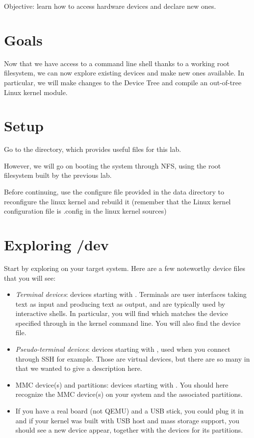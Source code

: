 {Objective: learn how to access hardware devices and declare new ones.}

\section{Goals}

Now that we have access to a command line shell thanks to a working root
filesystem, we can now explore existing devices and make new ones
available. In particular, we will make changes to the Device Tree
and compile an out-of-tree Linux kernel module.

\section{Setup}

Go to the  directory,
which provides useful files for this lab.

However, we will go on booting the system through NFS, using the
root filesystem built by the previous lab.

Before continuing, use the configure file provided in the data directory to
reconfigure the linux kernel and rebuild it (remember that the Linux kernel
configuration file is .config in the linux kernel sources)

\section{Exploring /dev}

Start by exploring  on your target system. Here are a few
noteworthy device files that you will see:

\begin{itemize}
 \item {\em Terminal devices}: devices starting with .
       Terminals are user interfaces taking text as
       input and producing text as output, and are typically used by
       interactive shells. In particular, you will find
        which matches the device specified through
        in the kernel command line. You will also find
       the {\tt \ttyname} device file.
 \item {\em Pseudo-terminal devices}: devices starting with ,
       used when you connect through SSH for example. Those are virtual
       devices, but there are so many in  that we wanted
       to give a description here.
 \item {MMC device(s) and partitions}: devices starting with
       . You should here recognize the MMC device(s)
       on your system and the associated partitions.
 \item If you have a real board (not QEMU) and a USB stick, you could
       plug it in and if your kernel was built with USB host and mass
       storage support, you should see a new  device appear,
       together with the  devices for its partitions.
\end{itemize}

